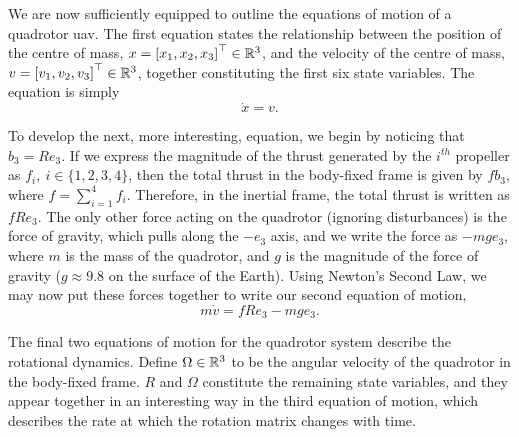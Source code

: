 We are now sufficiently equipped to outline the equations of motion of a quadrotor \gls{uav}. The first equation states the relationship between the position of the centre of mass, ${x={[x_1, x_2, x_3]}^\top \in \mathbb{R}^3}$, and the velocity of the centre of mass, $v={[v_1, v_2, v_3]}^\top \in \mathbb{R}^3$, together constituting the first six state variables. The equation is simply
\begin{equation}
    \dot x = v.\label{quad:dyn:eqn1}
\end{equation}

To develop the next, more interesting, equation, we begin by noticing that $b_3 = Re_3$. If we express the magnitude of the thrust generated by the $i^{th}$ propeller as $f_i,\ i \in \{1,2,3,4\}$, then the total thrust in the body-fixed frame is given by $fb_3$, where $f = \sum_{i=1}^4 f_i$. Therefore, in the inertial frame, the total thrust is written as $fRe_3$. The only other force acting on the quadrotor (ignoring disturbances) is the force of gravity, which pulls along the $-e_3$ axis, and we write the force as $-mge_3$, where $m$ is the mass of the quadrotor, and $g$ is the magnitude of the force of gravity ($g \approx 9.8$ on the surface of the Earth). Using Newton's Second Law, we may now put these forces together to write our second equation of motion,
\begin{equation}
    m\dot v = fRe_3 - mge_3.\label{quad:dyn:eqn2}
\end{equation}

The final two equations of motion for the quadrotor system describe the rotational dynamics. Define $\Omega \in \mathbb{R}^3$ to be the angular velocity of the quadrotor in the body-fixed frame. $R$ and $\Omega$ constitute the remaining state variables, and they appear together in an interesting way in the third equation of motion, which describes the rate at which the rotation matrix changes with time.

